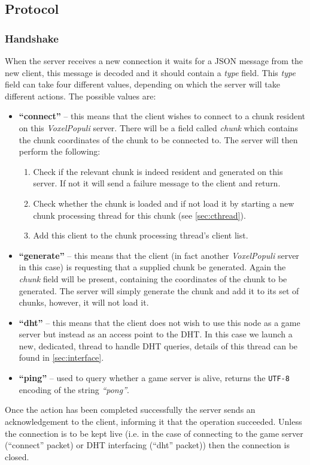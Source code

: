 \documentclass[10pt,twoside,notitlepage,a4paper]{report}
\newcommand{\voxpop}{\emph{VoxelPopuli}}
\begin{document}
	\subsection{Protocol}
	\subsubsection{Handshake}
	\label{sec:handshake}
	When the server receives a new connection it waits for a JSON message from the new client, this message is decoded and it should contain a \emph{type} field. This \emph{type} field can take four different values, depending on which the server will take different actions. The possible values are:
	\begin{itemize}
		\item \textbf{``connect''} -- this means that the client wishes to connect to a chunk resident on this \voxpop{} server. There will be a field called \emph{chunk} which contains the chunk coordinates of the chunk to be connected to. The server will then perform the following:
		\begin{enumerate}
			\item Check if the relevant chunk is indeed resident and generated on this server. If not it will send a failure message to the client and return.
			\item Check whether the chunk is loaded and if not load it by starting a new chunk processing thread for this chunk (see \cref{sec:cthread}).
			\item Add this client to the chunk processing thread's client list.
		\end{enumerate}
		\item \textbf{``generate''} -- this means that the client (in fact another \voxpop{} server in this case) is requesting that a supplied chunk be generated. Again the \emph{chunk} field will be present, containing the coordinates of the chunk to be generated. The server will simply generate the chunk and add it to its set of chunks, however, it will not load it.
		\item \textbf{``dht''} -- this means that the client does not wish to use this node as a game server but instead as an access point to the DHT. In this case we launch a new, dedicated, thread to handle DHT queries, details of this thread can be found in \cref{sec:interface}.
		\item \textbf{``ping''} -- used to query whether a game server is alive, returns the \texttt{UTF-8} encoding of the string \emph{``pong''}.
	\end{itemize}
	Once the action has been completed successfully the server sends an acknowledgement to the client, informing it that the operation succeeded. Unless the connection is to be kept live (i.e. in the case of connecting to the game server (``connect'' packet) or DHT interfacing (``dht'' packet)) then the connection is closed.
	
\end{document}
